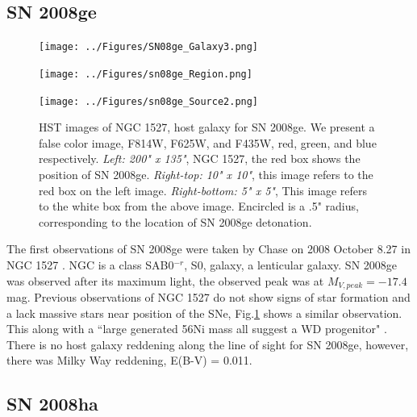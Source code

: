 \documentclass[preprint]{aastex}
\begin{document}
\subsection{SN 2008ge}
\begin{centering}
	\begin{figure}
	\begin{minipage}[c][7cm]{.5\textwidth}
		\vspace*{\fill}
		\centering
		\texttt{[image: ../Figures/SN08ge\_Galaxy3.png]}
			\label{fig:08gegal}
	\end{minipage}
	\begin{minipage}[c][7cm]{.5\textwidth}
		\vspace*{-.5cm}
		\centering
		\hspace*{1.48cm}\texttt{[image: ../Figures/sn08ge\_Region.png]}
			\label{fig:r08ge}\par%
		\hspace*{1.45cm}\texttt{[image: ../Figures/sn08ge\_Source2.png]}
			\label{fig:s08ge}
	\end{minipage}
	\caption{HST images of NGC 1527, host galaxy for SN 2008ge. We present a false color image,
	 F814W, F625W, and F435W, red, green, and blue respectively. \textit{Left: 200" x 135"}, NGC 1527,
	 the red box shows the position of SN 2008ge. \textit{Right-top: 10" x 10"}, 
	 this image refers to the red box on the left image. \textit{Right-bottom: 5" x 5"},
	This image refers to the white box from the above image. 
	Encircled is a .5" radius, corresponding to the location of SN 2008ge detonation.}
	\label{fig:08ge_whole}
	\end{figure}  
\end{centering}


The first observations of SN 2008ge were taken by
Chase on 2008 October 8.27 in NGC 1527 \citep{pig08}. 
NGC is a class SAB0$^{-r}$, S0, galaxy, a lenticular galaxy. 
SN 2008ge was observed after its maximum light, the observed peak was at
$M_{V,peak} = -17.4$ mag. %
 Previous observations of NGC 1527 do not show signs of star formation and a lack massive stars near 
position of the SNe, Fig.\ref{fig:08ge_whole} shows a similar observation.
This along with a ``large generated 56Ni mass all suggest a WD progenitor"  \citep{fol1011}.
There is no host galaxy reddening along the line of sight for SN 2008ge, however, there was 
Milky Way reddening, E(B-V) = 0.011. 


\subsection{SN 2008ha}
\end{document}
